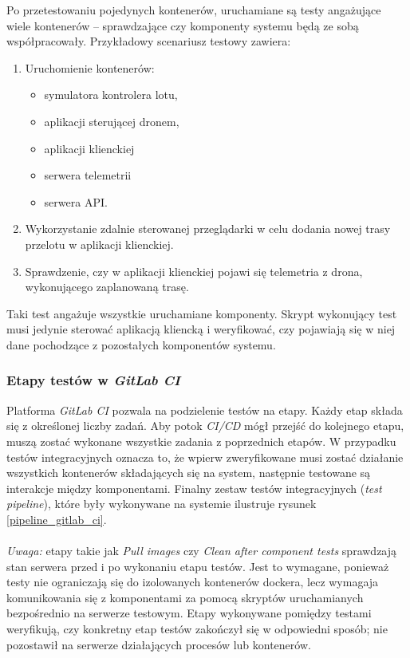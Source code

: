 Po przetestowaniu pojedynych kontenerów, uruchamiane są testy angażujące
wiele kontenerów -- sprawdzające czy komponenty systemu będą ze sobą współpracowały.
Przykładowy scenariusz testowy zawiera:

\begin{enumerate}
    \item Uruchomienie kontenerów:
    \begin{itemize}
        \item symulatora kontrolera lotu,
        \item aplikacji sterującej dronem,
        \item aplikacji klienckiej
        \item serwera telemetrii
        \item serwera API.
    \end{itemize}
    \item Wykorzystanie zdalnie sterowanej przeglądarki w
            celu dodania nowej trasy przelotu w aplikacji klienckiej.
    \item Sprawdzenie, czy w aplikacji klienckiej pojawi się telemetria z drona,
            wykonującego zaplanowaną trasę.
\end{enumerate}

Taki test angażuje wszystkie uruchamiane komponenty. Skrypt wykonujący test
musi jedynie sterować aplikacją kliencką i weryfikować, czy pojawiają się
w niej dane pochodzące z pozostałych komponentów systemu.

\subsubsection{Etapy testów w \textit{GitLab CI}}

Platforma \textit{GitLab CI} pozwala na podzielenie testów na etapy. 
Każdy etap składa się z określonej liczby zadań. Aby potok \textit{CI/CD}
mógł przejść do kolejnego etapu, muszą zostać wykonane wszystkie zadania 
z poprzednich etapów. W przypadku testów integracyjnych oznacza to, że wpierw
zweryfikowane musi zostać działanie wszystkich kontenerów składających się
na system, następnie testowane są interakcje między komponentami. 
Finalny zestaw testów integracyjnych (\textit{test pipeline}), które były
wykonywane na systemie ilustruje rysunek \ref{pipeline_gitlab_ci}.\\
\\
\noindent
\textit{Uwaga:} etapy takie jak \textit{Pull images} czy \textit{Clean after component tests}
sprawdzają stan serwera przed i po wykonaniu etapu testów. Jest to wymagane, ponieważ testy
nie ograniczają się do izolowanych kontenerów dockera, lecz wymagaja komunikowania się
z komponentami za pomocą skryptów uruchamianych bezpośrednio na serwerze testowym. 
Etapy wykonywane pomiędzy testami weryfikują, czy konkretny etap testów zakończył 
się w odpowiedni sposób; nie pozostawił na serwerze działających procesów lub kontenerów.

